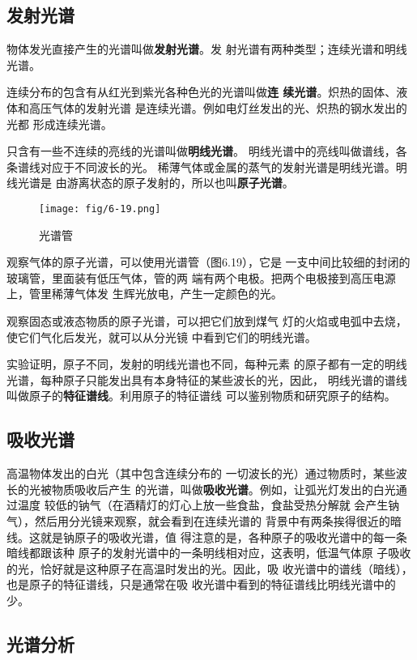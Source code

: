 \subsection{发射光谱}

物体发光直接产生的光谱叫做\textbf{发射光谱}。发
射光谱有两种类型；连续光谱和明线光谱。

连续分布的包含有从红光到紫光各种色光的光谱叫做\textbf{连
续光谱}。炽热的固体、液体和高压气体的发射光谱
是连续光谱。例如电灯丝发出的光、炽热的钢水发出的光都
形成连续光谱。

只含有一些不连续的亮线的光谱叫做\textbf{明线光谱}。
明线光谱中的亮线叫做谱线，各条谱线对应于不同波长的光。
稀薄气体或金属的蒸气的发射光谱是明线光谱。明线光谱是
由游离状态的原子发射的，所以也叫\textbf{原子光谱}。
\begin{figure}[htp]\centering
    \texttt{[image: fig/6-19.png]}
    \caption{光谱管}
    \end{figure}

观察气体的原子光谱，可以使用光谱管（图6.19），它是
一支中间比较细的封闭的玻璃管，里面装有低压气体，管的两
端有两个电极。把两个电极接到高压电源上，管里稀薄气体发
生辉光放电，产生一定颜色的光。

观察固态或液态物质的原子光谱，可以把它们放到煤气
灯的火焰或电弧中去烧，使它们气化后发光，就可以从分光镜
中看到它们的明线光谱。

实验证明，原子不同，发射的明线光谱也不同，每种元素
的原子都有一定的明线光谱，每种原子只能发出具有本身特征的某些波长的光，因此，
明线光谱的谱线叫做原子的\textbf{特征谱线}。利用原子的特征谱线
可以鉴别物质和研究原子的结构。

\subsection{吸收光谱}
高温物体发出的白光（其中包含连续分布的
一切波长的光）通过物质时，某些波长的光被物质吸收后产生
的光谱，叫做\textbf{吸收光谱}。例如，让弧光灯发出的白光通过温度
较低的钠气（在酒精灯的灯心上放一些食盐，食盐受热分解就
会产生钠气），然后用分光镜来观察，就会看到在连续光谱的
背景中有两条挨得很近的暗线。这就是钠原子的吸收光谱，值
得注意的是，各种原子的吸收光谱中的每一条暗线都跟该种
原子的发射光谱中的一条明线相对应，这表明，低温气体原
子吸收的光，恰好就是这种原子在高温时发出的光。因此，吸
收光谱中的谱线（暗线），也是原子的特征谱线，只是通常在吸
收光谱中看到的特征谱线比明线光谱中的少。

\subsection{光谱分析}

